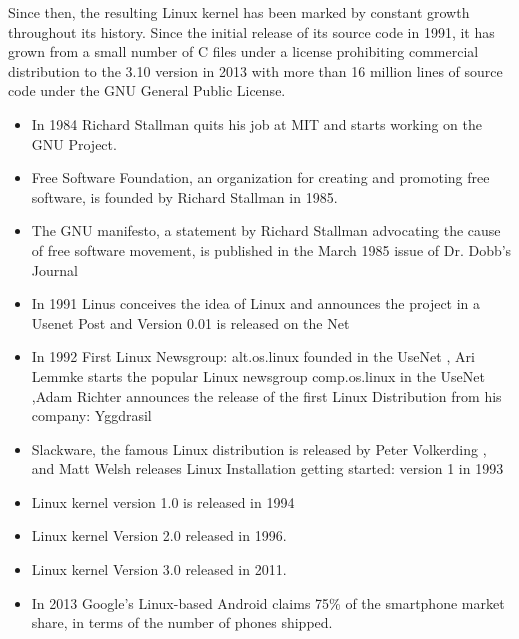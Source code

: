 \documentclass[11pt]{article} %
\begin{document}
Since then, the resulting Linux kernel has been marked by constant growth throughout its history. Since the initial release of its source code in 1991, it has grown from a small number of C files under a license prohibiting commercial distribution to the 3.10 version in 2013 with more than 16 million lines of source code under the GNU General Public License.
\begin{itemize}
\item In 1984 Richard Stallman quits his job at MIT and starts working on the GNU Project.
\item Free Software Foundation, an organization for creating and promoting free software, is founded by Richard Stallman in 1985.
\item The GNU manifesto, a statement by Richard Stallman advocating the cause of free software movement, is published in the March 1985 issue of Dr. Dobb's Journal

\item
In 1991 	Linus conceives the idea of Linux and announces the project in a Usenet Post and Version 0.01 is released on the Net
\item In 1992 	First Linux Newsgroup: alt.os.linux founded in the UseNet
, Ari Lemmke starts the popular Linux newsgroup comp.os.linux in the UseNet
,Adam Richter announces the release of the first Linux Distribution from his company: Yggdrasil

\item Slackware, the famous Linux distribution is released by Peter Volkerding , and Matt Welsh releases Linux Installation getting started: version 1 in 1993
\item Linux kernel version 1.0 is released in 1994
\item Linux kernel Version 2.0 released in 1996.
\item Linux kernel Version 3.0 released in 2011.

\item In 2013 Google's Linux-based Android claims 75\% of the smartphone market share, in terms of the number of phones shipped.
\end{itemize}
\end{document}
